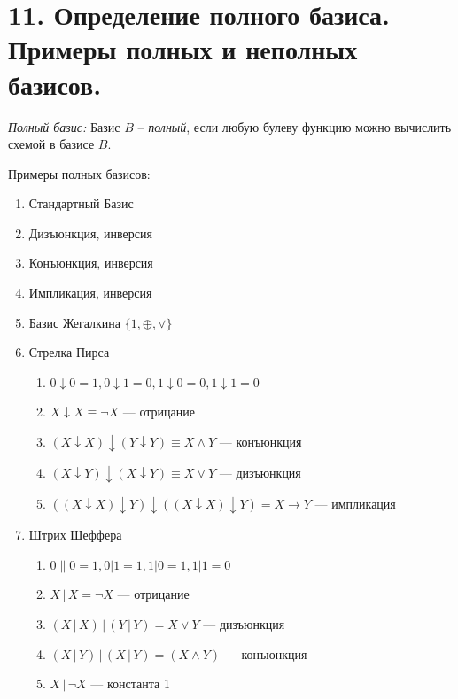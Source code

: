 \documentclass[a4paper, 12pt]{article}
\begin{document}
\section*{11. Определение полного базиса. Примеры полных и неполных базисов.}

\textit{Полный базис: } Базис $B$ -- \textit{полный}, если любую булеву функцию можно вычислить схемой в базисе $B$.
 
Примеры полных базисов:

\begin{enumerate}
    \item Стандартный Базис
    \item Дизъюнкция, инверсия
    \item Конъюнкция, инверсия
    \item Импликация, инверсия
    \item Базис Жегалкина $\lbrace 	1, \oplus, \vee \rbrace$
    \item Стрелка Пирса
    \begin{enumerate}
        \item $0 \downarrow 0 = 1, 0 \downarrow 1 = 0, 1 \downarrow 0 = 0, 1 \downarrow 1 = 0$
        \item $X \downarrow X \equiv \neg X$  — отрицание
        \item $\left( {X \downarrow X} \right) \downarrow \left( {Y \downarrow Y } \right) \equiv {X  \wedge Y }$  — конъюнкция
        \item $\left( {X \downarrow Y} \right) \downarrow \left( {X \downarrow Y} \right) \equiv X \vee Y$  — дизъюнкция
        \item $\left( \left( {X \downarrow X } \right) \downarrow Y \right) \downarrow \left( \left( {X \downarrow X } \right) \downarrow Y \right) = X \rightarrow Y$  — импликация
    \end{enumerate}
    \item Штрих Шеффера
    \begin{enumerate}
        \item $0 \| 0 = 1, 0 | 1 = 1, 1 | 0 = 1, 1 | 1 = 0$
        \item $X\,|\,X  = \neg X$  — отрицание
        \item $\left( {X \,|\,X } \right)\,|\,\left( {Y \,|\,Y } \right) = X \vee Y$  — дизъюнкция
        \item $\left( {X \,|\,Y } \right)\,|\,\left( {X \,|\,Y } \right) = \left( {X  \wedge Y } \right)$  — конъюнкция
        \item $X \,|\, \neg X$  — константа 1
    \end{enumerate}
\end{enumerate}
\end{document}
